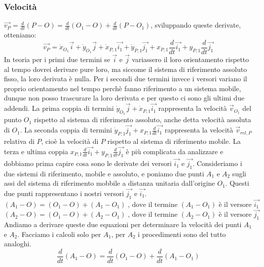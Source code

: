 \subsubsection{Velocità}
$\vec{v_P} = \frac{d}{dt} (P-O) = \frac{d}{dt} (O_1 - O) + \frac{d}{dt} (P-O_1)$, sviluppando queste derivate, otteniamo: 
\[
    \vec{v_P} = 
        \dot{x}_{O_1}\vec{i} + 
        \dot{y}_{O_1} \vec{j} + 
        \dot{x}_{P,1} \vec{i_1} + 
        \dot{y}_{P,1} \vec{j_1} + 
        x_{P,1} \frac{d}{dt}\vec{i_1} + 
        y_{P,1} \frac{d}{dt} \vec{j_1}
\]
In teoria per i primi due termini se $\vec{i}$ e $\vec{j}$ variassero il loro orientamento rispetto al tempo dovrei derivare pure loro, ma siccome il sistema di riferimento assoluto fisso, la loro derivata è nulla. Per i secondi due termini invece i versori variano il proprio orientamento nel tempo perchè fanno riferimento a un sistema mobile, dunque non posso trascurare la loro derivata e per questo ci sono gli ultimi due addendi.\newline
La prima coppia di termini $\dot{y}_{O_1} \vec{j} + \dot{x}_{P,1} \vec{i_1}$ rappresenta la velocità $\vec{v}_{O_1}$ del punto $O_1$ rispetto al sistema di riferimento assoluto, anche detta velocità assoluta di $O_1$.\newline
La seconda coppia di termini $\dot{y}_{P,1} \vec{j_1} + x_{P,1} \frac{d}{dt}\vec{i_1}$ rappresenta la velocità $\vec{v}_{rel, P}$ relativa di $P$, cioè la velocità di $P$ rispetto al sistema di riferimento mobile.\newline
La terza e ultima coppia $x_{P,1} \frac{d}{dt}\vec{i_1} + y_{P,1} \frac{d}{dt} \vec{j_1}$ è più complicata da analizzare e dobbiamo prima capire cosa sono le derivate dei versori $\vec{i_1}$ e $\vec{j_1}$.\newline
Consideriamo i due sistemi di riferimento, mobile e assoluto, e poniamo due punti $A_1$ e $A_2$ sugli assi del sistema di riferimento mobbile a distanza unitaria dall'origine $O_1$. Questi due punti rappresentano i nostri versori $\vec{j_1}$ e $\vec{i_1}$.
\[
    (A_1 - O) = (O_1-O) + (A_1 - O_1) \;\text{, dove il termine $(A_1-O_1)$ è il versore $\vec{i_1}$}\;
\]
\[
    (A_2 - O) = (O_1-O) + (A_2 - O_1) \;\text{, dove il termine $(A_2-O_1)$ è il versore $\vec{j_1}$}\;
\]
Andiamo a derivare queste due equazioni per determinare la velocità dei punti $A_1$ e $A_2$. Facciamo i calcoli solo per $A_1$, per $A_2$ i procedimenti sono del tutto analoghi.
\[
    \frac{d}{dt}(A_1-O) = \frac{d}{dt}(O_1 - O) + \frac{d}{dt}(A_1 -O_1)
\]
